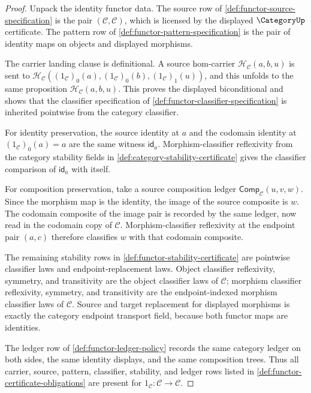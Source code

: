 \begin{proof}
Unpack the identity functor data. The source row of
\autoref{def:functor-source-specification} is the pair $(\mathcal C,\mathcal C)$,
which is licensed by the displayed $\CategoryUp$ certificate. The pattern row
of \autoref{def:functor-pattern-specification} is the pair of identity maps on
objects and displayed morphisms.

The carrier landing clause is definitional. A source hom-carrier
$\mathcal H_{\mathcal C}(a,b,u)$ is sent to
$\mathcal H_{\mathcal C}((1_{\mathcal C})_0(a),(1_{\mathcal C})_0(b),
(1_{\mathcal C})_1(u))$, and this unfolds to the same proposition
$\mathcal H_{\mathcal C}(a,b,u)$. This proves the displayed biconditional and
shows that the classifier specification of \autoref{def:functor-classifier-specification}
is inherited pointwise from the category classifier.

For identity preservation, the source identity at $a$ and the codomain
identity at $(1_{\mathcal C})_0(a)=a$ are the same witness $\mathsf{id}_a$.
Morphism-classifier reflexivity from the category stability fields in
\autoref{def:category-stability-certificate} gives the classifier comparison
of $\mathsf{id}_a$ with itself.

For composition preservation, take a source composition ledger
$\mathsf{Comp}_{\mathcal C}(u,v,w)$. Since the morphism map is the identity,
the image of the source composite is $w$. The codomain composite of the image
pair is recorded by the same ledger, now read in the codomain copy of
$\mathcal C$. Morphism-classifier reflexivity at the endpoint pair $(a,c)$
therefore classifies $w$ with that codomain composite.

The remaining stability rows in \autoref{def:functor-stability-certificate}
are pointwise classifier laws and endpoint-replacement laws. Object classifier
reflexivity, symmetry, and transitivity are the object classifier laws of
$\mathcal C$; morphism classifier reflexivity, symmetry, and transitivity are
the endpoint-indexed morphism classifier laws of $\mathcal C$. Source and
target replacement for displayed morphisms is exactly the category endpoint
transport field, because both functor maps are identities.

The ledger row of \autoref{def:functor-ledger-policy} records the same
category ledger on both sides, the same identity displays, and the same
composition trees. Thus all carrier, source, pattern, classifier, stability,
and ledger rows listed in \autoref{def:functor-certificate-obligations} are
present for $1_{\mathcal C}:\mathcal C\to\mathcal C$.
\end{proof}

